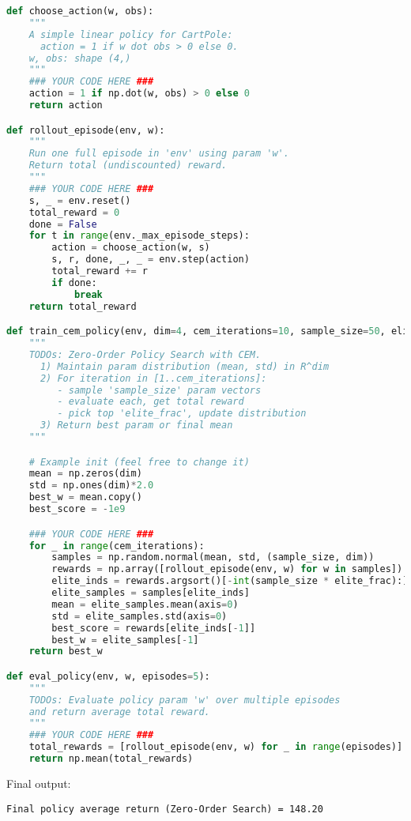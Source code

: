 \documentclass{article}
\begin{document}
\begin{solution}
\begin{lstlisting}[language=Python]
def choose_action(w, obs):
    """
    A simple linear policy for CartPole:
      action = 1 if w dot obs > 0 else 0.
    w, obs: shape (4,)
    """
    ### YOUR CODE HERE ###
    action = 1 if np.dot(w, obs) > 0 else 0
    return action

def rollout_episode(env, w):
    """
    Run one full episode in 'env' using param 'w'.
    Return total (undiscounted) reward.
    """
    ### YOUR CODE HERE ###
    s, _ = env.reset()
    total_reward = 0
    done = False
    for t in range(env._max_episode_steps):
        action = choose_action(w, s)
        s, r, done, _, _ = env.step(action)
        total_reward += r
        if done:
            break
    return total_reward

def train_cem_policy(env, dim=4, cem_iterations=10, sample_size=50, elite_frac=0.2):
    """
    TODOs: Zero-Order Policy Search with CEM.
      1) Maintain param distribution (mean, std) in R^dim
      2) For iteration in [1..cem_iterations]:
         - sample 'sample_size' param vectors
         - evaluate each, get total reward
         - pick top 'elite_frac', update distribution
      3) Return best param or final mean
    """

    # Example init (feel free to change it)
    mean = np.zeros(dim)
    std = np.ones(dim)*2.0
    best_w = mean.copy()
    best_score = -1e9

    ### YOUR CODE HERE ###
    for _ in range(cem_iterations):
        samples = np.random.normal(mean, std, (sample_size, dim))
        rewards = np.array([rollout_episode(env, w) for w in samples])
        elite_inds = rewards.argsort()[-int(sample_size * elite_frac):]
        elite_samples = samples[elite_inds]
        mean = elite_samples.mean(axis=0)
        std = elite_samples.std(axis=0)
        best_score = rewards[elite_inds[-1]]
        best_w = elite_samples[-1]
    return best_w

def eval_policy(env, w, episodes=5):
    """
    TODOs: Evaluate policy param 'w' over multiple episodes
    and return average total reward.
    """
    ### YOUR CODE HERE ###
    total_rewards = [rollout_episode(env, w) for _ in range(episodes)]
    return np.mean(total_rewards)
\end{lstlisting}
Final output:
\begin{lstlisting}
Final policy average return (Zero-Order Search) = 148.20
\end{lstlisting}
\end{solution}
\end{document}
